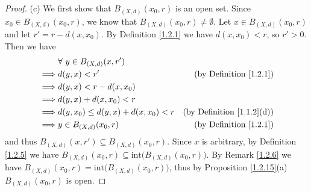 \begin{proof}{(c)}
    We first show that \(B_{(X, d)}(x_0, r)\) is an open set.
    Since \(x_0 \in B_{(X, d)}(x_0, r)\), we know that \(B_{(X, d)}(x_0, r) \neq \emptyset\).
    Let \(x \in B_{(X, d)}(x_0, r)\) and let \(r' = r - d(x, x_0)\).
    By Definition \ref{1.2.1} we have \(d(x, x_0) < r\), so \(r' > 0\).
    Then we have
    \begin{align*}
                 & \forall\ y \in B_{(X, d)}(x, r')                                               \\
        \implies & d(y, x) < r'                           & \text{(by Definition \ref{1.2.1})}    \\
        \implies & d(y, x) < r - d(x, x_0)                                                        \\
        \implies & d(y, x) + d(x, x_0) < r                                                        \\
        \implies & d(y, x_0) \leq d(y, x) + d(x, x_0) < r & \text{(by Definition \ref{1.1.2}(d))} \\
        \implies & y \in B_{(X, d)}(x_0, r)               & \text{(by Definition \ref{1.2.1})}
    \end{align*}
    and thus \(B_{(X, d)}(x, r') \subseteq B_{(X, d)}(x_0, r)\).
    Since \(x\) is arbitrary, by Definition \ref{1.2.5} we have \(B_{(X, d)}(x_0, r) \subseteq \text{int}\big(B_{(X, d)}(x_0, r)\big)\).
    By Remark \ref{1.2.6} we have \(B_{(X, d)}(x_0, r) = \text{int}\big(B_{(X, d)}(x_0, r)\big)\), thus by Proposition \ref{1.2.15}(a) \(B_{(X, d)}(x_0, r)\) is open.


\end{proof}
